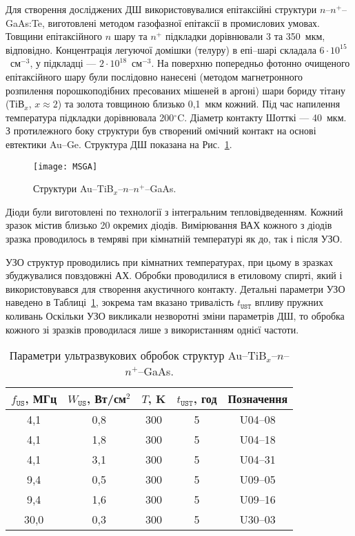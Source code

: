 Для створення досліджених ДШ використовувалися епітаксійні структури $n$--$n^+$--GaAs:Te,
виготовлені методом газофазної епітаксії в промислових умовах.
Товщини епітаксійного $n$ шару та $n^+$ підкладки дорівнювали 3 та 350~мкм, відповідно.
Концентрація легуючої домішки (телуру) в епі--шарі складала $6\cdot10^{15}$~см$^{-3}$,
у підкладці --- $2\cdot10^{18}$~см$^{-3}$.
На поверхню попередньо фотонно очищеного епітаксійного шару були послідовно нанесені
(методом магнетронного розпилення порошкоподібних пресованих мішеней в аргоні)
шари бориду тітану (ТіВ$_x$, $x\approx2$) та золота товщиною близько 0,1~мкм кожний.
Під час напилення температура підкладки дорівнювала 200$^\circ$C.
Діаметр контакту Шотткі --- 40~мкм.
З протилежного боку структури був створений омічний контакт на основі евтектики Au--Ge.
Структура ДШ показана на Рис.~\ref{figMSGA}.

\begin{figure}[b]
\center
\texttt{[image: MSGA]}%
\caption{\label{figMSGA}
Структури Au--TiB$_x$--$n$--$n^+$--GaAs.
}
\end{figure}

Діоди були виготовлені по технології з інтегральним тепловідведенням.
Кожний зразок містив близько 20 окремих діодів.
Вимірювання ВАХ кожного з діодів зразка проводилось в темряві при кімнатній температурі
як до, так і після УЗО.

УЗО структур проводились при кімнатних температурах, при цьому в зразках збуджувалися повздовжні АХ.
Обробки проводилися в етиловому спирті, який і використовувався для створення акустичного контакту.
Детальні параметри УЗО наведено в Таблиці~\ref{tabUST}, зокрема там вказано тривалість $t_\mathtt{UST}$ впливу пружних коливань
Оскільки УЗО викликали незворотні зміни параметрів ДШ, то обробка кожного зі зразків проводилася лише з використанням однієї частоти.

\begin{table}
\caption{\label{tabUST}Параметри ультразвукових обробок структур Au--TiB$_x$--$n$--$n^+$--GaAs.
}
\center
\begin{tabular}{|c|c|c|c|c|}
\hline
$f_\mathtt{US}$, МГц&$W_{\mathtt{US}}$, Вт/см$^2$&$T$, K&$t_\mathtt{UST}$, год &Позначення\\
\hline
4,1&0,8&300&5&U04--08\\ \hline
4,1&1,8&300&5&U04--18\\ \hline
4,1&3,1&300&5&U04--31\\ \hline
9,4&0,5&300&5&U09--05\\ \hline
9,4&1,6&300&5&U09--16\\ \hline
30,0&0,3&300&5&U30--03\\ \hline
\end{tabular}
\end{table}


